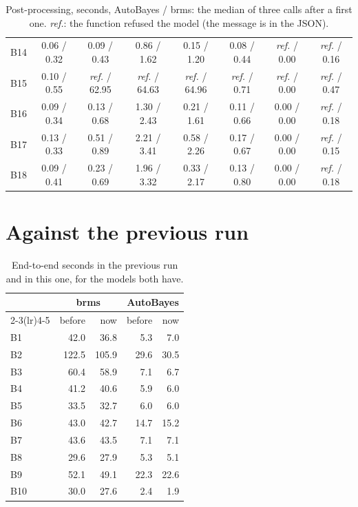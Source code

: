 \documentclass[11pt]{article}
\begin{document}
\begin{table}[H]
\begin{center}
\begin{tabular}{@{}lccccccc@{}}
B14 & 0.06 / 0.32 & 0.09 / 0.43 & 0.86 / 1.62 & 0.15 / 1.20 & 0.08 / 0.44 & \textit{ref.} / 0.00 & \textit{ref.} / 0.16 \\
B15 & 0.10 / 0.55 & \textit{ref.} / 62.95 & \textit{ref.} / 64.63 & \textit{ref.} / 64.96 & \textit{ref.} / 0.71 & \textit{ref.} / 0.00 & \textit{ref.} / 0.47 \\
B16 & 0.09 / 0.34 & 0.13 / 0.68 & 1.30 / 2.43 & 0.21 / 1.61 & 0.11 / 0.66 & 0.00 / 0.00 & \textit{ref.} / 0.18 \\
B17 & 0.13 / 0.33 & 0.51 / 0.89 & 2.21 / 3.41 & 0.58 / 2.26 & 0.17 / 0.67 & 0.00 / 0.00 & \textit{ref.} / 0.15 \\
B18 & 0.09 / 0.41 & 0.23 / 0.69 & 1.96 / 3.32 & 0.33 / 2.17 & 0.13 / 0.80 & 0.00 / 0.00 & \textit{ref.} / 0.18 \\
\bottomrule
\end{tabular}\end{center}
\caption{\small Post-processing, seconds, AutoBayes / brms: the median of three calls after a first one. \textit{ref.}: the function refused the model (the message is in the JSON).}\label{tab:post}
\end{table}

\section{Against the previous run}

\begin{table}[H]
\small
\setlength{\tabcolsep}{4pt}
\begin{center}
\begin{tabular}{@{}lrrrr@{}}
\toprule
& \multicolumn{2}{c}{brms} & \multicolumn{2}{c}{AutoBayes} \\
\cmidrule(lr){2-3}\cmidrule(lr){4-5}& before & now & before & now \\
\midrule
B1 & 42.0 & 36.8 & 5.3 & 7.0 \\
B2 & 122.5 & 105.9 & 29.6 & 30.5 \\
B3 & 60.4 & 58.9 & 7.1 & 6.7 \\
B4 & 41.2 & 40.6 & 5.9 & 6.0 \\
B5 & 33.5 & 32.7 & 6.0 & 6.0 \\
B6 & 43.0 & 42.7 & 14.7 & 15.2 \\
B7 & 43.6 & 43.5 & 7.1 & 7.1 \\
B8 & 29.6 & 27.9 & 5.3 & 5.1 \\
B9 & 52.1 & 49.1 & 22.3 & 22.6 \\
B10 & 30.0 & 27.6 & 2.4 & 1.9 \\
\bottomrule
\end{tabular}\end{center}
\caption{\small End-to-end seconds in the previous run and in this one, for the models both have.}\label{tab:prev}
\end{table}
\end{document}
